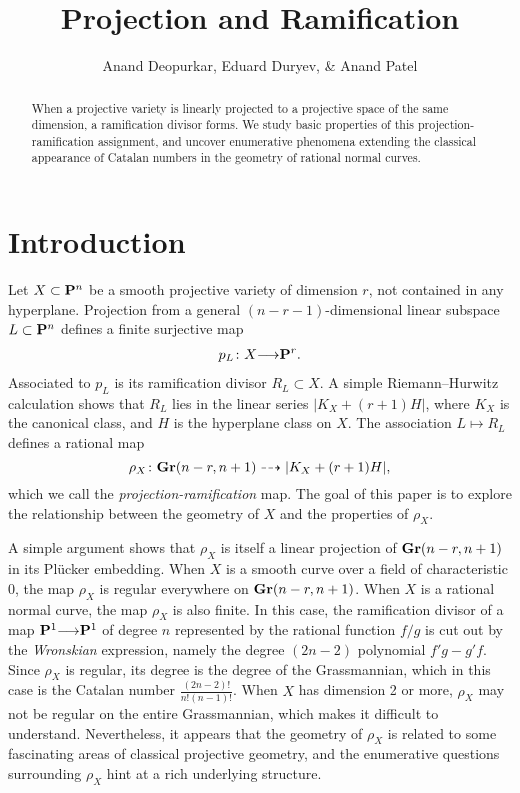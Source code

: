 \documentclass[11pt,reqno]{amsart}
\title{Projection and Ramification}
\author{Anand Deopurkar, Eduard Duryev, \& Anand Patel}
\theoremstyle{plain}
\theoremstyle{definition}
\theoremstyle{remark}
\numberwithin{equation}{section}
\renewcommand{\to}{{\longrightarrow}}
\numberwithin{equation}{section}
\begin{document}
\begin{abstract}
    When a projective variety is linearly projected to a projective space of the same dimension, a ramification divisor forms. We study basic properties of this projection-ramification assignment, and uncover enumerative phenomena extending the classical appearance of Catalan numbers in the geometry of rational normal curves.
\end{abstract}


\maketitle
\tableofcontents


\section{Introduction}\label{sec:intro}
Let $X \subset \P^n$ be a smooth projective variety of dimension $r$, not contained in any hyperplane.
Projection from a general $(n-r-1)$-dimensional linear subspace $L \subset \P^n$ defines a finite surjective map
\begin{align*}
  p_{L}\from X \to \P^{r}.
\end{align*}
Associated to $p_L$ is its ramification divisor $R_L \subset X$.
A simple Riemann--Hurwitz calculation shows that $R_L$ lies in the linear series $|K_X + (r+1)H|$, where $K_X$ is the canonical class, and $H$ is the hyperplane class on $X$.
The association $L \mapsto R_L$ defines a rational map
\[ \rho_X \from \Gr(n-r, n+1) \dashrightarrow |K_X + (r+1)H|, \]
which we call the \emph{projection-ramification} map.
The goal of this paper is to explore the relationship between the geometry of $X$ and the properties of $\rho_X$.

A simple argument shows that $\rho_X$ is itself a linear projection of $\Gr(n-r, n+1)$ in its Pl\"ucker embedding.
When $X$ is a smooth curve over a field of characteristic $0$, the map $\rho_X$ is regular everywhere on $\Gr(n-r, n+1)$.
When $X$ is a rational normal curve, the map $\rho_X$ is also finite.
In this case, the ramification divisor of a map $\P^1 \to \P^1$ of degree $n$ represented by the rational function $f/g$ is cut out by the \emph{Wronskian} expression, namely the degree $(2n-2)$ polynomial $f'g - g'f$.
Since $\rho_X$ is regular, its degree is the degree of the Grassmannian, which in this case is the Catalan number $\frac{(2n-2)!}{n!(n-1)!}$.
When $X$ has dimension 2 or more, $\rho_X$ may not be regular on the entire Grassmannian, which makes it difficult to understand.
Nevertheless, it appears that the geometry of $\rho_X$ is related to some fascinating areas of classical projective geometry, and the enumerative questions surrounding $\rho_X$ hint at a rich underlying structure. 
\end{document}
